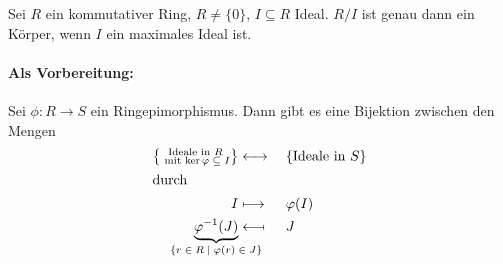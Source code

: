 \documentclass[12pt,a4paper]{scrartcl}
\begin{document}
\begin{satz} \label{satz8}
	Sei $R$ ein kommutativer Ring, $R \neq\{0\}$, $I\subseteq R$ Ideal. $R/I$ ist genau dann ein Körper, wenn $I$ ein maximales Ideal ist.
\end{satz}

\paragraph{Als Vorbereitung:}

\begin{satz}
	Sei $\phi\colon R\to S$ ein Ringepimorphismus. Dann gibt es eine Bijektion zwischen den Mengen
	\begin{alignat*}{2}
		\left\{\substack{\text{Ideale in $R$}\\\text{ mit $\ker \phi\subseteq I$} }\right\}&\longleftrightarrow \; &&\{\text{Ideale in $S$}\} \\\intertext{durch}
		I & \longmapsto &&\phi(I)\\
		\underbrace{\phi^{-1}(J)}_{\mathclap{\text{$\{r\in R\mid\phi(r) \in J\}$}}} & \longmapsfrom && J
	\end{alignat*}
\end{satz}
\end{document}
